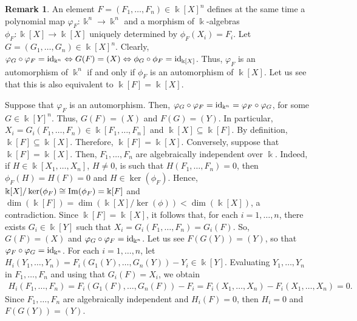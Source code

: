 \documentclass[11pt,reqno]{amsart}
\theoremstyle{definition}
\newtheorem{remark}[theorem]{Remark}
\newcommand{\mbk}{\mbox{$\Bbbk$}}
\newcommand{\im}{\mbox{${\rm Im}$}}
\begin{document}
\begin{remark}\label{rem:equiv}
An element $F=(F_1,\ldots,F_n)\in\mbk[X]^n$ defines at the same time a polynomial map $\varphi_F:\mbk^n\to\mbk^n$ and a morphism of $\mbk$-algebras $\phi_F:\mbk[X]\to\mbk[X]$ uniquely determined by $\phi_F(X_i)=F_i$. Let
$G=(G_1,\ldots,G_n)\in\mbk[X]^n$. Clearly,  
$\varphi_{G}\circ\varphi_F={\rm id}_{\Bbbk^n}\Leftrightarrow G(F)=(X)\Leftrightarrow 
\phi_G\circ\phi_F={\rm id}_{\Bbbk[X]}$. Thus, $\varphi_F$ is an automorphism of
$\mbk^n$ if and only if $\phi_F$ is an automorphism of $\mbk[X]$. Let us see that this is also equivalent to $\mbk[F]=\mbk[X]$.

Suppose that $\varphi_F$ is an automorphism. Then, $\varphi_G\circ\varphi_F={\rm id}_{\Bbbk^n}=
\varphi_F\circ\varphi_G$, for some $G\in\mbk[Y]^n$. Thus, $G(F)=(X)$ and $F(G)=(Y)$. In particular, 
$X_i=G_i(F_1,\ldots,F_n)\in\mbk[F_1,\ldots,F_n]$ and 
$\mbk[X]\subseteq\mbk[F]$. By definition, $\mbk[F]\subseteq \mbk[X]$. Therefore, $\mbk[F]=\mbk[X]$.
Conversely, suppose that $\mbk[F]=\mbk[X]$. Then, $F_1,\ldots,F_n$ are algebraically independent over $\mbk$. Indeed, if $H\in\mbk[X_1,\ldots,X_n]$, $H\neq 0$, is such that 
$H(F_1,\ldots,F_n)=0$, then $\phi_F(H)=H(F)=0$ and $H\in\ker(\phi_F)$. Hence, $\mbk[X]/\ker(\phi_F)\cong\im(\phi_F)=\mbk[F]$ and
$\dim(\mbk[F])=\dim(\mbk[X]/\ker(\phi))<\dim(\mbk[X])$, a contradiction. Since $\mbk[F]=\mbk[X]$, it follows 
that, for each $i=1,\ldots,n$, 
there exists $G_i\in\mbk[Y]$ such that $X_i=G_i(F_1,\ldots,F_n)=G_i(F)$. So, $G(F)=(X)$ and $\varphi_G\circ\varphi_F={\rm id}_{\Bbbk^n}$. Let us see $F(G(Y))=(Y)$, so that $\varphi_F\circ\varphi_G={\rm id}_{\Bbbk^n}$. For each
$i=1,\ldots,n$, let $H_i(Y_1,\ldots,Y_n)=F_i(G_1(Y),\ldots,G_n(Y))-Y_i\in\mbk[Y]$. 
Evaluating $Y_1,\ldots,Y_n$ in $F_1,\ldots,F_n$ and using that $G_i(F)=X_i$, we obtain
\begin{eqnarray*}
H_i(F_1,\ldots,F_n)=F_i(G_1(F),\ldots,G_n(F))-F_i=F_i(X_1,\ldots,X_n)-F_i(X_1,\ldots,X_n)=0.
\end{eqnarray*}
Since $F_1,\ldots,F_n$ are algebraically independent and $H_i(F)=0$, then
$H_i=0$ and $F(G(Y))=(Y)$.
\end{remark}
\end{document}
